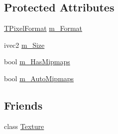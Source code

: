 \subsection*{Protected Attributes}
\begin{DoxyCompactItemize}
\item 
\hyperlink{namespace_agmd_afc48fd9fa5dccb4c5621c052bfd1a7ec}{T\+Pixel\+Format} \hyperlink{class_agmd_1_1_texture_base_a95bb57c8f3b23d5044c3a7a929d1bf48}{m\+\_\+\+Format}
\item 
ivec2 \hyperlink{class_agmd_1_1_texture_base_a7c8b66c08ba4c3ae22b5fd0e33034d06}{m\+\_\+\+Size}
\item 
bool \hyperlink{class_agmd_1_1_texture_base_af47c70880846b5faf6dd3641d558d611}{m\+\_\+\+Has\+Mipmaps}
\item 
bool \hyperlink{class_agmd_1_1_texture_base_a5be700cf0b42657e702539b3cd90a3f0}{m\+\_\+\+Auto\+Mipmaps}
\end{DoxyCompactItemize}
\subsection*{Friends}
\begin{DoxyCompactItemize}
\item 
class \hyperlink{class_agmd_1_1_texture_base_af7f909106d08e36cd50aa58e36f9bf47}{Texture}
\end{DoxyCompactItemize}


